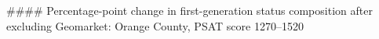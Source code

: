 #### Percentage-point change in first-generation status composition after excluding Geomarket: Orange County, PSAT score 1270–1520
